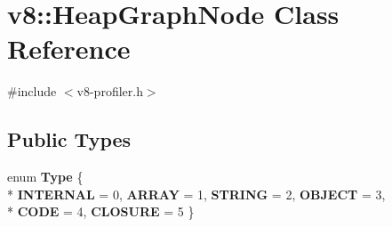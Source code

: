 \hypertarget{classv8_1_1_heap_graph_node}{}\section{v8\+:\+:Heap\+Graph\+Node Class Reference}
\label{classv8_1_1_heap_graph_node}


{\ttfamily \#include $<$v8-\/profiler.\+h$>$}

\subsection*{Public Types}
\begin{DoxyCompactItemize}
\item 
\hypertarget{classv8_1_1_heap_graph_node_ab674a58103a51abc56f99edc6a1479ed}{}enum {\bfseries Type} \{ \\*
{\bfseries I\+N\+T\+E\+R\+N\+A\+L} = 0, 
{\bfseries A\+R\+R\+A\+Y} = 1, 
{\bfseries S\+T\+R\+I\+N\+G} = 2, 
{\bfseries O\+B\+J\+E\+C\+T} = 3, 
\\*
{\bfseries C\+O\+D\+E} = 4, 
{\bfseries C\+L\+O\+S\+U\+R\+E} = 5
 \}\label{classv8_1_1_heap_graph_node_ab674a58103a51abc56f99edc6a1479ed}

\end{DoxyCompactItemize}
